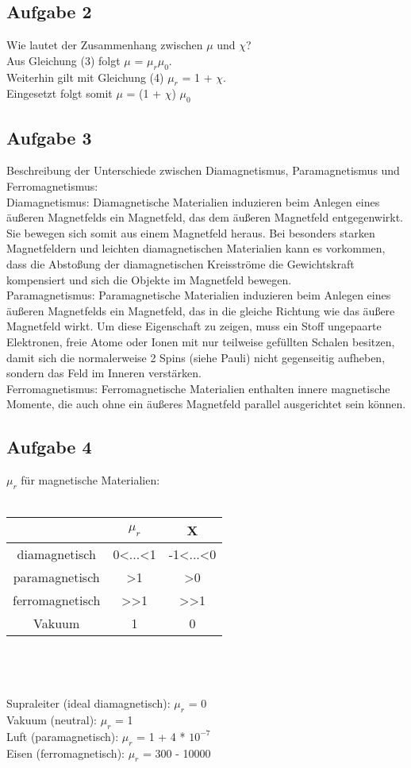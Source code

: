 \documentclass[a4paper,10pt]{scrartcl}
\begin{document}
\subsection{Aufgabe 2}
Wie lautet der Zusammenhang zwischen $\mu$ und $\chi$?\\
Aus Gleichung (3) folgt $\mu$ = $\mu_r$$\mu_0$. \\
Weiterhin gilt mit Gleichung (4) $\mu_r$ = 1 + $\chi$. \\
Eingesetzt folgt somit $\mu$ = (1 + $\chi$) $\mu_0$

\subsection{Aufgabe 3}
Beschreibung der Unterschiede zwischen Diamagnetismus, Paramagnetismus und Ferromagnetismus: \\
Diamagnetismus: Diamagnetische Materialien induzieren beim Anlegen eines äußeren Magnetfelds ein Magnetfeld, das dem äußeren Magnetfeld entgegenwirkt. Sie bewegen sich somit aus einem Magnetfeld heraus. Bei besonders starken Magnetfeldern und leichten diamagnetischen Materialien kann es vorkommen, dass die Abstoßung der diamagnetischen Kreisströme die Gewichtskraft kompensiert und sich die Objekte im Magnetfeld bewegen. \\
Paramagnetismus: Paramagnetische Materialien induzieren beim Anlegen eines äußeren Magnetfelds ein Magnetfeld, das in die gleiche Richtung wie das äußere Magnetfeld wirkt. Um diese Eigenschaft zu zeigen, muss ein Stoff ungepaarte Elektronen, freie Atome oder Ionen mit nur teilweise gefüllten Schalen besitzen, damit sich die normalerweise 2 Spins (siehe Pauli) nicht gegenseitig aufheben, sondern das Feld im Inneren verstärken. \\
Ferromagnetismus: Ferromagnetische Materialien enthalten innere magnetische Momente, die auch ohne ein äußeres Magnetfeld parallel ausgerichtet sein können.
\subsection{Aufgabe 4}
$\mu_r$ für magnetische Materialien: \\ \\
\begin{tabular}{|c|c|c|} \hline
	 & $\mu_r$ & X \\ \hline
	diamagnetisch & 0<...<1 & -1<...<0 \\ \hline
	paramagnetisch & >1 & >0 \\ \hline
	ferromagnetisch & >>1 & >>1 \\ \hline
	Vakuum & 1 & 0 \\ \hline
\end{tabular} \\ \\ \\
Supraleiter (ideal diamagnetisch): $\mu_r$ = 0 \\
Vakuum (neutral): $\mu_r$ = 1 \\
Luft (paramagnetisch):  $\mu_r$ = 1 + 4 * $10^{-7}$ \\
Eisen (ferromagnetisch):  $\mu_r$ = 300 - 10000 \\
\end{document}

